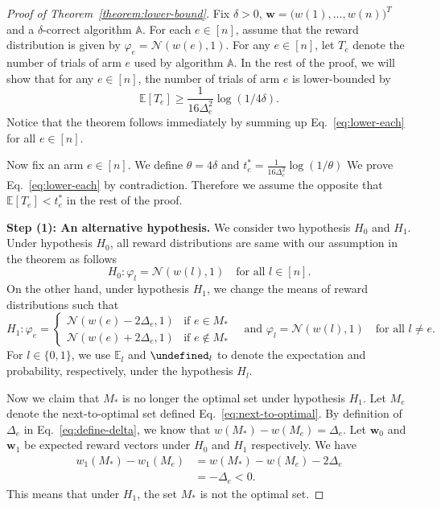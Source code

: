 \documentclass{article}
\newcommand{\Rew}{\varphi}
\newcommand{\E}{\mathbb E}
\let\Pr\undefined
\DeclareMathOperator{\Pr}{Pr}
\renewcommand{\vec}[1]{\boldsymbol{#1}}
\begin{document}
\begin{proof}[Proof of Theorem~\ref{theorem:lower-bound}]
Fix $\delta >0$, $\vec w =\big(w(1),\ldots,w(n)\big)^T$ and a $\delta$-correct algorithm $\mathbb A$.
For each $e\in [n]$, assume that the reward distribution is given by $\Rew_e=\mathcal N(w(e),1)$.
For any $e\in [n]$, let $T_e$ denote the  number of trials of arm $e$ used by algorithm $\mathbb A$.
In the rest of the proof, we will show that for any $e\in [n]$, the number of trials of arm $e$ is lower-bounded by
\begin{equation}
\E[T_e] \ge \frac{1}{16\Delta_e^2}\log(1/4\delta).
\label{eq:lower-each}
\end{equation}
Notice that the theorem follows immediately by summing up Eq.~\eqref{eq:lower-each} for all $e\in[n]$.

Now fix an arm $e\in [n]$.  
We define $\theta=4\delta$ and $t_e^* = \frac{1}{16\Delta_e^2}\log(1/\theta)$
We prove Eq.~\eqref{eq:lower-each} by contradiction. 
Therefore we assume the opposite that $\E[T_e] < t_e^*$ in the rest of the proof.


\textbf{Step (1): An alternative hypothesis.}
We consider two hypothesis $H_0$ and $H_1$. 
Under hypothesis $H_0$, all reward distributions are same with our assumption in the theorem as follows
$$
H_0: \Rew_l = \mathcal N(w(l),1) \quad \text{for all } l \in [n].
$$
On the other hand, under hypothesis $H_1$, we change the means of reward distributions such that 
$$
H_1: 
	\Rew_e = \begin{cases}
	\mathcal N(w(e)-2\Delta_e,1) & \text{if } e\in M_*\\
	\mathcal N(w(e)+2\Delta_e,1) & \text{if } e\not\in M_*
\end{cases} 
\quad\text{and } \Rew_l=\mathcal N(w(l), 1) \quad\text{for all } l\not = e.
$$
For $l\in \{0,1\}$, we use $\E_l$ and $\Pr_l$ to denote the expectation and probability, respectively, under the hypothesis $H_l$.


Now we claim that $M_*$ is no longer the optimal set under hypothesis $H_1$. 
Let $M_e$ denote the next-to-optimal set defined Eq.~\eqref{eq:next-to-optimal}.
By definition of $\Delta_e$ in Eq.~\eqref{eq:define-delta}, we know that $w(M_*)-w(M_e)=\Delta_e$.
Let $\vec w_0$ and $\vec w_1$ be expected reward vectors under $H_0$ and $H_1$ respectively.
We have
\begin{align*}
w_1(M_*)-w_1(M_e) &= w(M_*)-w(M_e)-2\Delta_e \\
								  &= -\Delta_e < 0.
\end{align*}
This means that under $H_1$, the set $M_*$ is not the optimal set.


\end{proof}
\end{document}

